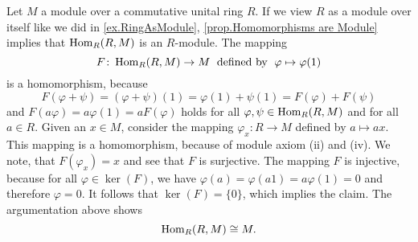 \begin{rem}
Let $M$ a module over a commutative unital ring $R$. If we view $R$ as a module over itself like we did in \cref{ex.RingAsModule}, \cref{prop.Homomorphisms are Module} implies that $\operatorname{\mathrm{Hom}}_R(R,M)$ is an $R$-module. The mapping 
\[ F\colon\operatorname{\mathrm{Hom}}_R(R,M)\to M\;\text{ defined by }\;\varphi\mapsto\varphi(1) \]
is a homomorphism, because 
\begin{equation*}
F(\varphi+\psi)=(\varphi+\psi)(1)=\varphi(1)+\psi(1)=F(\varphi)+F(\psi)
\end{equation*}
and $F(a\varphi)=a\varphi(1)=aF(\varphi)$ holds for all $\varphi,\psi\in\operatorname{\mathrm{Hom}}_R(R,M)$ and for all $a\in R$. Given an $x\in M$, consider the mapping $\varphi_x\colon R\to M$ defined by $a\mapsto ax$. This mapping is a homomorphism, because of module axiom (ii) and (iv). We note, that $F(\varphi_x)=x$ and see that $F$ is surjective. The mapping $F$ is injective, because for all $\varphi\in\ker(F)$, we have $\varphi(a)=\varphi(a1)=a\varphi(1)=0$ and therefore $\varphi=0$. It follows that $\ker(F)=\lbrace 0\rbrace$, which implies the claim. The argumentation above shows
\begin{equation*}
\operatorname{\mathrm{Hom}}_R(R,M)\cong M.
\end{equation*}
\end{rem}